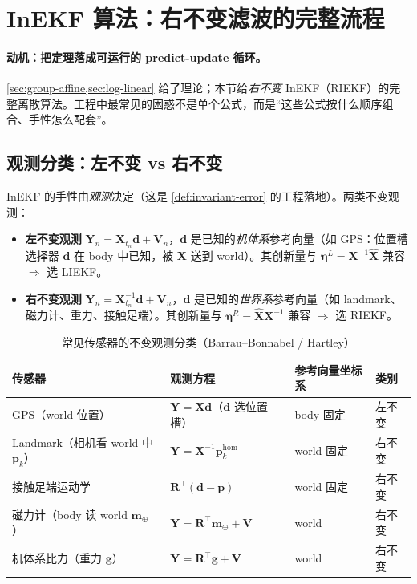 \section{InEKF 算法：右不变滤波的完整流程}
\label{sec:inekf-algo}

\paragraph{动机：把定理落成可运行的 predict-update 循环。}
\cref{sec:group-affine,sec:log-linear} 给了理论；本节给\emph{右不变} InEKF（RIEKF）的完整离散算法。工程中最常见的困惑不是单个公式，而是“这些公式按什么顺序组合、手性怎么配套”。

\subsection{观测分类：左不变 vs 右不变}
\label{subsec:obs-classify}

InEKF 的手性由\emph{观测}决定（这是 \cref{def:invariant-error} 的工程落地）。两类不变观测：
\begin{itemize}
  \item \textbf{左不变观测} $\mathbf{Y}_n=\mathbf{X}_{t_n}\mathbf{d}+\mathbf{V}_n$，$\mathbf{d}$ 是已知的\emph{机体系}参考向量（如 GPS：位置槽选择器 $\mathbf{d}$ 在 body 中已知，被 $\mathbf{X}$ 送到 world）。其创新量与 $\boldsymbol{\eta}^L=\mathbf{X}^{-1}\hat{\mathbf{X}}$ 兼容 $\Rightarrow$ 选 LIEKF。
  \item \textbf{右不变观测} $\mathbf{Y}_n=\mathbf{X}_{t_n}^{-1}\mathbf{d}+\mathbf{V}_n$，$\mathbf{d}$ 是已知的\emph{世界系}参考向量（如 landmark、磁力计、重力、接触足端）。其创新量与 $\boldsymbol{\eta}^R=\hat{\mathbf{X}}\mathbf{X}^{-1}$ 兼容 $\Rightarrow$ 选 RIEKF。
\end{itemize}

\begin{table}[H]\centering\small
\caption{常见传感器的不变观测分类（Barrau--Bonnabel / Hartley）}
\label{tab:obs-classify}
\begin{tabular}{llll}
\toprule
传感器 & 观测方程 & 参考向量坐标系 & 类别 \\
\midrule
GPS（world 位置） & $\mathbf{Y}=\mathbf{X}\mathbf{d}$（$\mathbf{d}$ 选位置槽） & body 固定 & 左不变 \\
Landmark（相机看 world 中 $\mathbf{p}_k$） & $\mathbf{Y}=\mathbf{X}^{-1}\mathbf{p}_k^{\mathrm{hom}}$ & world 固定 & 右不变 \\
接触足端运动学 & $\mathbf{R}^\top(\mathbf{d}-\mathbf{p})$ & world 固定 & 右不变 \\
磁力计（body 读 world $\mathbf{m}_\oplus$） & $\mathbf{Y}=\mathbf{R}^\top\mathbf{m}_\oplus+\mathbf{V}$ & world & 右不变 \\
机体系比力（重力 $\mathbf{g}$） & $\mathbf{Y}=\mathbf{R}^\top\mathbf{g}+\mathbf{V}$ & world & 右不变 \\
\bottomrule
\end{tabular}
\end{table}

